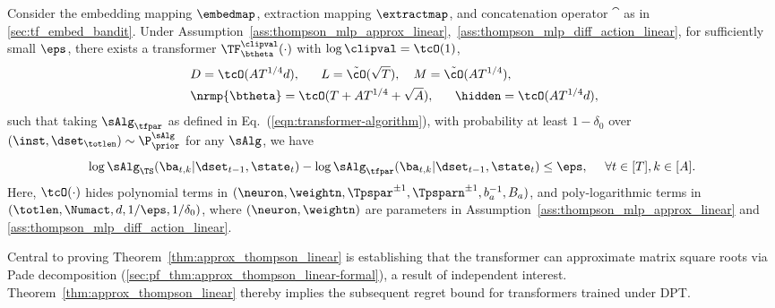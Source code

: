 \documentclass[10pt]{article}
\newcommand{\authnote}[2]{{\scriptsize $\ll$\textsf{#1 notes: #2}$\gg$}}
\newcommand{\authnote}[2]{}
\newcommand{\lc}[1]{{\color{blue}\authnote{Licong}{#1}}}
\begin{document}
\begin{theorem}\label{thm:approx_thompson_linear}
Consider the embedding mapping $\embedmap$, extraction mapping $\extractmap$, and concatenation operator $\cat$ as in \ref{sec:tf_embed_bandit}. 
Under Assumption~\ref{ass:thompson_mlp_approx_linear},~\ref{ass:thompson_mlp_diff_action_linear}, for sufficiently small $\eps$, there exists a transformer $\TF_\btheta^{\clipval}(\cdot)$ with $\log \clipval = \tcO(1)$, 
\begin{equation}\label{eq:ts_tf_param-main}
\begin{aligned}
&~D = \tcO(AT^{1/4}d),~~~~~ L=\tilde \cO(\sqrt{T}),~~~M =\tilde \cO(A T^{1/4}), \\
&~\nrmp{\btheta} = \tcO(T+A T^{1/4}+\sqrt{A}),~~~~~ \hidden = \tcO(A T^{1/4}d),
\end{aligned}
\end{equation}
such that taking $\sAlg_{\tfpar}$ as defined in Eq.~(\ref{eqn:transformer-algorithm}), with probability at least $1-\delta_0$ over $(\inst, \dset_{\totlen}) \sim \P_{\prior}^{\sAlg}$ for any $\sAlg$, we have
\[
 \log \sAlg_{\TS}(\ba_{t,k}|\dset_{t-1},\state_t) - \log \sAlg_{\tfpar}(\ba_{t,k}|\dset_{t-1},\state_t) \leq \eps,~~~~\forall t\in[T],k\in[A]. 
\]
Here, $\tcO(\cdot)$ hides polynomial terms in $(\neuron,\weightn, \Tpspar^{\pm1}, \Tpsparn^{\pm1}, b_a^{-1}, B_a)$, and poly-logarithmic terms in $(\totlen, \Numact, d, 1/\eps,\\ 1/\delta_0)$, where $(\neuron, \weightn)$ are parameters in Assumption~\ref{ass:thompson_mlp_approx_linear} and \ref{ass:thompson_mlp_diff_action_linear}. 
\end{theorem}

Central to proving Theorem~\ref{thm:approx_thompson_linear} is establishing that the transformer can approximate matrix square roots via Pade decomposition (\cref{sec:pf_thm:approx_thompson_linear-formal}), a result of independent interest. Theorem~\ref{thm:approx_thompson_linear} thereby implies the subsequent regret bound for transformers trained under DPT. 
\end{document}
